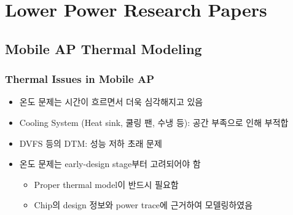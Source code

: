 \section{Lower Power Research Papers}

\subsection{Mobile AP Thermal Modeling}

\subsubsection*{Thermal Issues in Mobile AP}
\begin{itemize}
    \item 온도 문제는 시간이 흐르면서 더욱 심각해지고 있음
    \item Cooling System (Heat sink, 쿨링 팬, 수냉 등): 공간 부족으로 인해 부적합
    \item DVFS 등의 DTM: 성능 저하 초래 문제
    \item 온도 문제는 early-design stage부터 고려되어야 함
    \begin{itemize}
        \item Proper thermal model이 반드시 필요함
        \item Chip의 design 정보와 power trace에 근거하여 모델링하였음
    \end{itemize}
\end{itemize}

